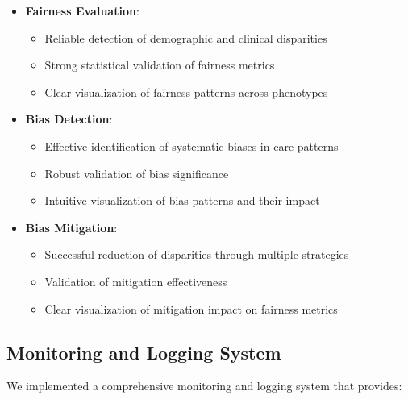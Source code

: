 \documentclass[12pt]{article}
\begin{document}
\begin{itemize}
    \item \textbf{Fairness Evaluation}:
    \begin{itemize}
        \item Reliable detection of demographic and clinical disparities
        \item Strong statistical validation of fairness metrics
        \item Clear visualization of fairness patterns across phenotypes
    \end{itemize}
    
    \item \textbf{Bias Detection}:
    \begin{itemize}
        \item Effective identification of systematic biases in care patterns
        \item Robust validation of bias significance
        \item Intuitive visualization of bias patterns and their impact
    \end{itemize}
    
    \item \textbf{Bias Mitigation}:
    \begin{itemize}
        \item Successful reduction of disparities through multiple strategies
        \item Validation of mitigation effectiveness
        \item Clear visualization of mitigation impact on fairness metrics
    \end{itemize}
\end{itemize}

\subsection{Monitoring and Logging System}

We implemented a comprehensive monitoring and logging system that provides:
\end{document}
